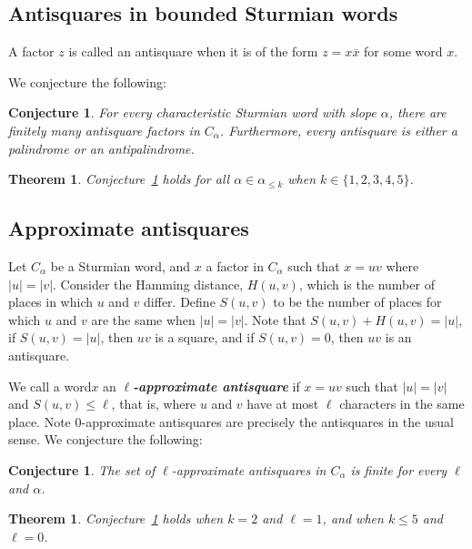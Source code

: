 \documentclass[a4paper]{article}
\newcommand{\word}{word\xspace}
\newcommand{\factor}{factor\xspace}
\newcommand{\term}[1]{\emph{\textbf{#1}}}
\theoremstyle{definition}
\theoremstyle{remark}
\theoremstyle{remark}
\theoremstyle{plain}
\newtheorem{theorem}[definition]{Theorem}
\newtheorem{conjecture}[definition]{Conjecture}
\begin{document}
\subsection{Antisquares in bounded Sturmian words}

A factor $z$ is called an antisquare when it is of the form $z = x\overline{x}$ for some word $x$.

We conjecture the following:

\begin{conjecture}\label{conj:antisq}
    For every characteristic Sturmian word with slope $\alpha$, there are finitely many antisquare factors in $C_{\alpha}$.
    Furthermore, every antisquare is either a palindrome or an antipalindrome.
\end{conjecture}

\begin{theorem}\label{thm:antisq}
Conjecture~\ref{conj:antisq} holds for all $\alpha \in \alpha_{\leq k}$ when $k \in \{1,2,3,4,5\}$.
\end{theorem}

\subsection{Approximate antisquares}

Let $C_{\alpha}$ be a Sturmian word, and $x$ a \factor in $C_{\alpha}$ such that $x=uv$ where $|u| = |v|$.
Consider the Hamming distance, $H(u,v)$, which is the number of places in which $u$ and $v$ differ.
Define $S(u,v)$ to be the number of places for which $u$ and $v$ are the same when $|u| = |v|$.
Note that $S(u,v) + H(u,v) = |u|$, if $S(u,v) = |u|$, then $uv$ is a square, and if $S(u,v) = 0$, then $uv$ is an antisquare.

We call a \word $x$ an \term{$\ell$-approximate antisquare} if $x = uv$ such that $|u| = |v|$ and $S(u,v) \leq \ell$, that is, where $u$ and $v$ have at most $\ell$ characters in the same place.
Note $0$-approximate antisquares are precisely the antisquares in the usual sense.
We conjecture the following:

\begin{conjecture}\label{conj:approx-antisq}
    The set of $\ell$-approximate antisquares in $C_{\alpha}$ is finite for every $\ell$ and $\alpha$.
\end{conjecture}

\begin{theorem}\label{thm:approx-antisq}
Conjecture~\ref{conj:approx-antisq} holds when $k = 2$ and $\ell = 1$, and when $k \leq 5$ and $\ell = 0$.
\end{theorem}
\end{document}

